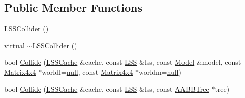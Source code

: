 \subsection*{Public Member Functions}
\begin{DoxyCompactItemize}
\item 
\hyperlink{classOpcode_1_1LSSCollider_a4d249606834d6c0ad1ffb3e350b6fcc8}{L\+S\+S\+Collider} ()
\item 
virtual \hyperlink{classOpcode_1_1LSSCollider_a51b4c522fb19188b11858d884aec2c55}{$\sim$\+L\+S\+S\+Collider} ()
\item 
bool \hyperlink{classOpcode_1_1LSSCollider_a4c4ff9f48a8b7b2b01b71beea04ee261}{Collide} (\hyperlink{structOpcode_1_1LSSCache}{L\+S\+S\+Cache} \&cache, const \hyperlink{classOpcode_1_1LSS}{L\+SS} \&lss, const \hyperlink{classOpcode_1_1Model}{Model} \&model, const \hyperlink{classOpcode_1_1Matrix4x4}{Matrix4x4} $\ast$worldl=\hyperlink{IceTypes_8h_ac97b8ee753e4405397a42ad5799b0f9e}{null}, const \hyperlink{classOpcode_1_1Matrix4x4}{Matrix4x4} $\ast$worldm=\hyperlink{IceTypes_8h_ac97b8ee753e4405397a42ad5799b0f9e}{null})
\item 
bool \hyperlink{classOpcode_1_1LSSCollider_a3e68e9b2ecdbed62116fec0b3ec8d4cd}{Collide} (\hyperlink{structOpcode_1_1LSSCache}{L\+S\+S\+Cache} \&cache, const \hyperlink{classOpcode_1_1LSS}{L\+SS} \&lss, const \hyperlink{classOpcode_1_1AABBTree}{A\+A\+B\+B\+Tree} $\ast$tree)
\end{DoxyCompactItemize}
